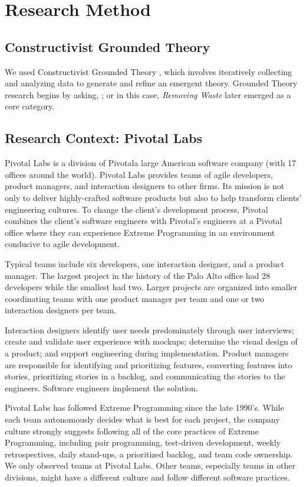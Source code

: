 \section{Research Method}
\label{ResearchMethod}
\subsection{Constructivist Grounded Theory}
We used Constructivist Grounded Theory \cite{Charmaz}, which involves iteratively collecting and analyzing data to generate and refine an emergent theory. Grounded Theory research begins by asking,  \cite{GlaserTheoreticalSensitivity}; or in this case,  \textit{Removing Waste}  later emerged as a core category.
\subsection{Research Context: Pivotal Labs}
Pivotal Labs is a division of Pivotal\textemdash a large American software company (with 17 offices around the world). Pivotal Labs provides teams of agile developers, product managers, and interaction designers to other firms. Its mission is not only to deliver highly-crafted software products but also to help transform clients' engineering cultures. To change the client's development process, Pivotal combines the client's software engineers with Pivotal's engineers at a Pivotal office where they can experience Extreme Programming \cite{BeckExtremeProgramming2004} in an environment conducive to agile development. 

Typical teams include six developers, one interaction designer, and a product manager. The largest project in the history of the Palo Alto office had 28 developers while the smallest had two. Larger projects are organized into smaller coordinating teams with one product manager per team and one or two interaction designers per team.

Interaction designers identify user needs predominately through user interviews; create and validate user experience with mockups; determine the visual design of a product; and support engineering during implementation. Product managers are responsible for identifying and prioritizing features, converting features into stories, prioritizing stories in a backlog, and communicating the stories to the engineers. Software engineers implement the solution. 

Pivotal Labs has followed Extreme Programming \cite{BeckExtremeProgramming2004} since the late 1990's. While each team autonomously decides what is best for each project, the company culture strongly suggests following all of the core practices of Extreme Programming, including pair programming, test-driven development, weekly retrospectives, daily stand-ups, a prioritized backlog, and team code ownership. We only observed teams at Pivotal Labs. Other teams, especially teams in other divisions, might have a different culture and follow different software practices.
